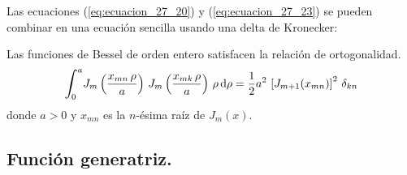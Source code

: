 \documentclass[12pt]{article}
\def\scaleint#1{\vcenter{\hbox{\scaleto[3ex]{\displaystyle\int}{#1}}}}
\def\bs{\mkern-12mu}
\numberwithin{equation}{section}
\begin{document}
Las ecuaciones (\ref{eq:ecuacion_27_20}) y (\ref{eq:ecuacion_27_23}) se pueden combinar en una ecuación sencilla usando una delta de Kronecker:
\begin{tcolorbox}
Las funciones de Bessel de orden entero satisfacen la relación de ortogonalidad.
\begin{align}
\begin{aligned}
\scaleint{6ex}_{\bs 0}^{a} J_{m} \left(\dfrac{x_{mn} \, \rho}{a} \right) \, J_{m} \left(\dfrac{x_{mk} \, \rho}{a} \right) \, \rho \dd{\rho} = \dfrac{1}{2} a^{2} \, \left[ J_{m+1} (x_{mn}) \right]^{2} \, \delta_{kn}
\end{aligned}
\label{eq:ecuacion_27_24}
\end{align}
donde $a > 0$ y $x_{mn}$ es la $n$-ésima raíz de $J_{m}(x)$.
\end{tcolorbox}

\subsection{Función generatriz.}
\end{document}
